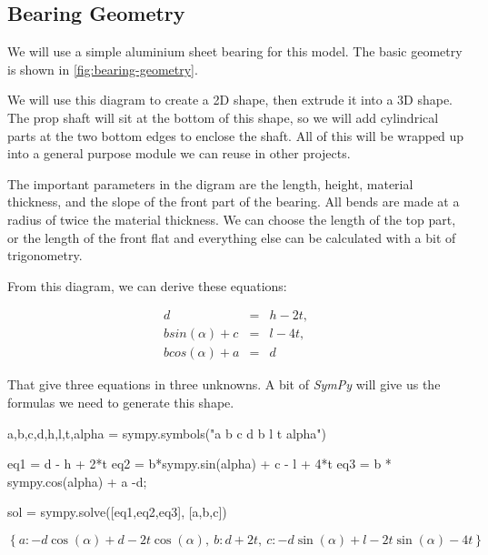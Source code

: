 \subsection{Bearing Geometry}

We will use a simple aluminium sheet bearing for this model. The basic geometry
is shown in \ref{fig:bearing-geometry}.


We will use this diagram to create a 2D shape, then extrude it into a 3D shape.
The prop shaft will sit at the bottom of this shape, so we will add cylindrical
parts at the two bottom edges to enclose the shaft. All of this will be wrapped
up into a general purpose module we can reuse in other projects.

The important parameters in the digram are the length, height, material thickness, and
the slope of the front part of the bearing. All bends are made at a radius of
twice the material thickness. We can choose the length of the top part, or the
length of the front flat and everything else can be calculated with a bit of
trigonometry.

From this diagram, we can derive these equations:

\begin{eqnarray}
  d &=& h - 2t, \\
  b sin(\alpha) + c &=& l - 4t, \\
  b cos(\alpha) + a &=& d
\end{eqnarray}

That give three equations in three unknowns. A bit of {\it SymPy} will give us
the formulas we need to generate this shape.

\begin{sympysilent}
a,b,c,d,h,l,t,alpha = sympy.symbols("a b c d b l t alpha")

eq1 = d - h + 2*t
eq2 = b*sympy.sin(alpha) + c - l + 4*t
eq3 = b * sympy.cos(alpha) + a -d;

sol = sympy.solve([eq1,eq2,eq3], [a,b,c])
\end{sympysilent}

\begin{equation}
\left\{ a : - d \cos{\left(\alpha \right)} + d - 2 t \cos{\left(\alpha \right)}, \  b : d + 2 t, \  c : - d \sin{\left(\alpha \right)} + l - 2 t \sin{\left(\alpha \right)} - 4 t\right\}
\end{equation}


